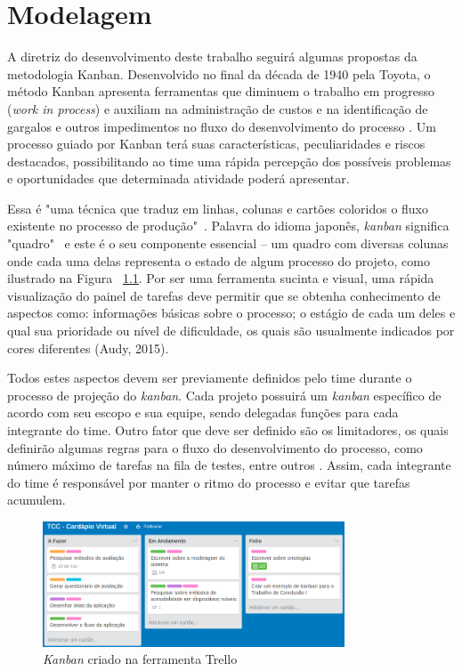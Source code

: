 \chapter{\label{chap:modelagem}Modelagem}
A diretriz do desenvolvimento deste trabalho seguirá algumas propostas da metodologia Kanban. Desenvolvido no final da década de 1940 pela Toyota, o método Kanban apresenta ferramentas que diminuem o trabalho em progresso (\textit{work in process}) e  auxiliam na administração de custos e na identificação de gargalos e outros impedimentos no fluxo do desenvolvimento do processo \cite{GROSS2003}. Um processo guiado por Kanban terá suas características, peculiaridades e riscos destacados, possibilitando ao time uma rápida percepção dos possíveis problemas e oportunidades que determinada atividade poderá apresentar.

Essa é "uma técnica que traduz em linhas, colunas e cartões coloridos o fluxo existente no processo de produção"\ \cite{AUDY2015}. Palavra do idioma japonês, \textit{kanban} significa "quadro"\ \cite{GROSS2003} e este é o seu componente essencial -- um quadro com diversas colunas onde cada uma delas representa o estado de algum processo do projeto, como ilustrado na Figura ~\ref{fig:kanban1}. Por ser uma ferramenta sucinta e visual, uma rápida visualização do painel de tarefas deve permitir que se obtenha conhecimento de aspectos como: informações básicas sobre o processo; o estágio de cada um deles e qual sua prioridade ou nível de dificuldade, os quais são usualmente indicados por cores diferentes (Audy, 2015). 

Todos estes aspectos devem ser previamente definidos pelo time durante o processo de projeção do \textit{kanban}. Cada projeto possuirá um \textit{kanban} específico de acordo com seu escopo e sua equipe, sendo delegadas funções para cada integrante do time. Outro fator que deve ser definido são os limitadores, os quais definirão algumas regras para o fluxo do desenvolvimento do processo, como número máximo de tarefas na fila de testes, entre outros \cite{AUDY2015}. Assim, cada integrante do time é responsável por manter o ritmo do processo e evitar que tarefas acumulem.

\begin{figure}[htb]
\centering
\caption[\emph{Kanban}]{\label{fig:kanban1}\emph{Kanban} criado na ferramenta Trello}
\includegraphics[width=0.8\textwidth]{fig/kanban1.png}
\end{figure}


